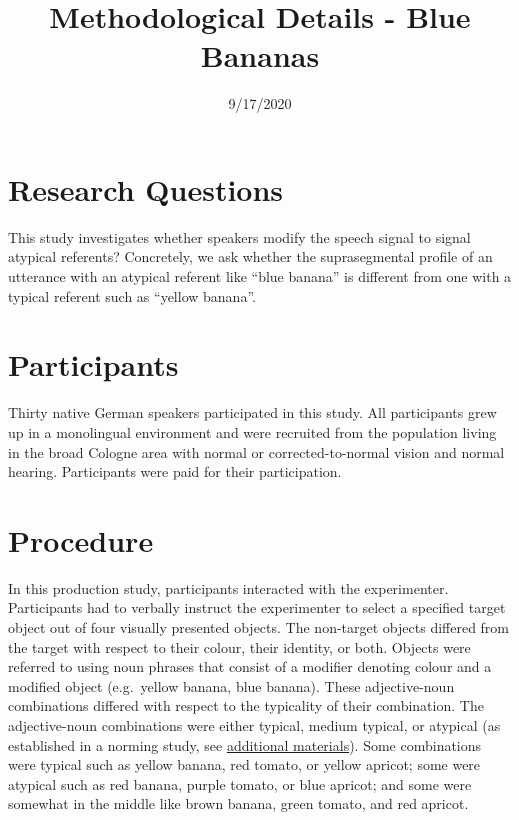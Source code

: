 \documentclass[
]{article}
\title{Methodological Details - Blue Bananas}
\author{}
\date{\vspace{-2.5em}9/17/2020}
\begin{document}
\maketitle

\hypertarget{research-questions}{%
\section{Research Questions}\label{research-questions}}

This study investigates whether speakers modify the speech signal to
signal atypical referents? Concretely, we ask whether the suprasegmental
profile of an utterance with an atypical referent like ``blue banana''
is different from one with a typical referent such as ``yellow banana''.

\hypertarget{participants}{%
\section{Participants}\label{participants}}

Thirty native German speakers participated in this study. All
participants grew up in a monolingual environment and were recruited
from the population living in the broad Cologne area with normal or
corrected-to-normal vision and normal hearing. Participants were paid
for their participation.

\hypertarget{procedure}{%
\section{Procedure}\label{procedure}}

In this production study, participants interacted with the experimenter.
Participants had to verbally instruct the experimenter to select a
specified target object out of four visually presented objects. The
non-target objects differed from the target with respect to their
colour, their identity, or both. Objects were referred to using noun
phrases that consist of a modifier denoting colour and a modified object
(e.g.~yellow banana, blue banana). These adjective-noun combinations
differed with respect to the typicality of their combination. The
adjective-noun combinations were either typical, medium typical, or
atypical (as established in a norming study, see
\protect\hyperlink{adds}{additional materials}). Some combinations were
typical such as yellow banana, red tomato, or yellow apricot; some were
atypical such as red banana, purple tomato, or blue apricot; and some
were somewhat in the middle like brown banana, green tomato, and red
apricot.
\end{document}

